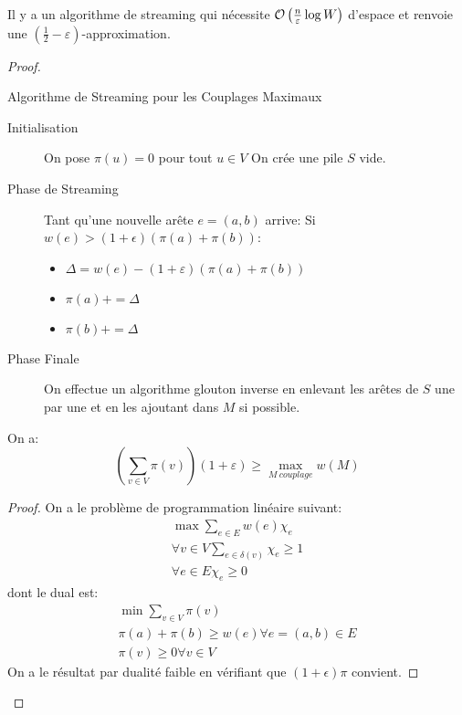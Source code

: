 \documentclass[math, info]{cours}
\begin{document}
\begin{thm}
	Il y a un algorithme de streaming qui nécessite $\mathcal{O}\left(\frac{n}{\varepsilon}\log W \right)$ d'espace et renvoie une $\left(\frac{1}{2}-\varepsilon \right)$-approximation.
\end{thm}
\begin{proof}
\begin{algorithm}
	\caption{Algorithme de Streaming pour les Couplages Maximaux}
	\begin{description}
		\item[Initialisation] On pose $\pi(u) = 0$ pour tout $u \in V$
			On crée une pile $S$ vide.
		\item[Phase de Streaming]
			Tant qu'une nouvelle arête $e =(a, b)$ arrive:
			Si $w(e) > (1 + \epsilon)(\pi(a) + \pi(b))$:
			\begin{itemize}
				\item $\Delta = w(e) - (1 + \varepsilon)(\pi(a) + \pi(b))$
				\item $\pi(a) += \Delta$
				\item $\pi(b) += \Delta$
			\end{itemize}
		\item[Phase Finale] On effectue un algorithme glouton inverse en enlevant les arêtes de $S$ une par une et en les ajoutant dans $M$ si possible.
	\end{description}
	\label{alg:streamingmatching}
\end{algorithm}

\begin{lemme}
	On a:
	\begin{equation*}
		\left(\sum_{v \in V} \pi(v) \right)\left(1 + \varepsilon \right) \geq \max_{M \ couplage} w(M)
	\end{equation*}
	\label{lemma:streammatching1}
\end{lemme}
\begin{proof}
	On a le problème de programmation linéaire suivant:
	\begin{align*}
		\max \sum_{e \in E} w(e)\chi_{e}\\
		\forall v \in V \sum_{e \in \delta(v)} \chi_{e} \geq 1\\
		\forall e \in E \chi_{e} \geq 0
	\end{align*}
	dont le dual est:
	\begin{align*}
		\min \sum_{v \in V}\pi(v)\\
		\pi(a) + \pi(b) \geq w(e) \forall e=(a, b) \in E\\
		\pi(v) \geq 0 \forall v \in V
	\end{align*}
	On a le résultat par dualité faible en vérifiant que $(1 + \epsilon)\pi$ convient.
\end{proof}


\end{proof}
\end{document}
